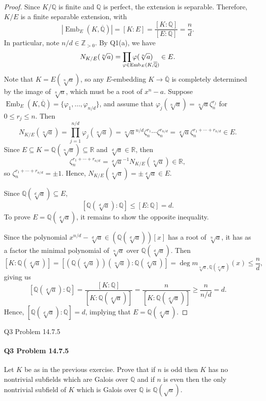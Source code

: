 \documentclass[12pt]{article}
\makeatletter
\newenvironment{fullbox}{\begin{lrbox}{\savefullbox}\begin{minipage}{\dimexpr\textwidth-2\fboxsep\relax}}{\end{minipage}\end{lrbox}\begin{center}\framebox[\textwidth]{\usebox{\savefullbox}}\end{center}}
\newenvironment{pbox}[1][]{\begin{fullbox}\ifx#1\empty\else\paragraph{#1}\fi}{\end{fullbox}}
\newcommand{\Z}{\mathbb{Z}}
\newcommand{\Q}{\mathbb{Q}}
\newcommand{\R}{\mathbb{R}}
\renewcommand{\phi}{\varphi}
\newcommand{\<}{\langle}
\renewcommand{\>}{\rangle}
\newcommand{\clo}{\overline}
\DeclareMathOperator{\Emb}{Emb}
\newcommand\myprod[2]{
    \begin{array}[t]{@{}l@{}}
        {\displaystyle\prod #2} \\[-3pt] \scriptstyle #1 
    \end{array}
}
\makeatother
\begin{document}
\begin{proof}
    Since $K/\Q$ is finite and $\Q$ is perfect, the extension is separable. Therefore, $K/E$ is a finite separable extension, with
    \[
        |\Emb_{E}(K, \clo{\Q})| = [K : E] = \frac{[K : \Q]}{[E : \Q]} = \frac{n}{d}.
    \]
    In particular, note $n/d \in \Z_{>0}$. By Q1(a), we have
    \[
        N_{K/E}(\sqrt[n]{a})
            = \myprod{\phi \in \Emb_{E}(K, \clo{\Q})}{\phi(\sqrt[n]{a})}
            \in E.
    \]
    Note that $K = E(\sqrt[n]{a})$, so any $E$-embedding $K \to \clo{\Q}$ is completely determined by the image of $\sqrt[n]{a}$, which must be a root of $x^n - a$. Suppose $\Emb_{E}(K, \clo{\Q}) = \{\phi_1, \dots, \phi_{n/d}\}$, and assume that $\phi_j(\sqrt[n]{a}) = \sqrt[n]{a} \zeta_n^{r_j}$ for $0 \leq r_j \leq n$. Then
    \[
        N_{K/E}(\sqrt[n]{a})
            = \prod_{j=1}^{n/d} \phi_j(\sqrt[n]{a})
            = \sqrt[n]{a}^{n/d} \zeta_n^{r_1} \cdots \zeta_n^{r_{n/d}}
            = \sqrt[d]{a} \zeta_n^{r_1 + \cdots + r_{n/d}}
            \in E.
    \]
    Since $E \subseteq K = \Q(\sqrt[n]{a}) \subseteq \R$ and $\sqrt[d]{a} \in \R$, then
    \[
        \zeta_n^{r_1 + \cdots + r_{n/d}} = \sqrt[d]{a}^{-1}N_{K/E}(\sqrt[n]{a}) \in \R,
    \]
    so $\zeta_n^{r_1 + \cdots + r_{n/d}} = \pm1$. Hence, $N_{K/E}(\sqrt[n]{a}) = \pm\sqrt[d]{a} \in E$. 
    
    Since $\Q(\sqrt[d]{a}) \subseteq E$, 
    \[
        [\Q(\sqrt[d]{a}) : \Q] \leq [E : \Q] = d.
    \]
    To prove $E = \Q(\sqrt[d]{a})$, it remains to show the opposite inequality.

    Since the polynomial $x^{n/d} - \sqrt[d]{a} \in (\Q(\sqrt[d]{a}))[x]$ has a root of $\sqrt[n]{a}$, it has as a factor the minimal polynomial of $\sqrt[n]{a}$ over $\Q(\sqrt[d]{a})$. Then
    \[
        [K : \Q(\sqrt[d]{a})] 
            = [(\Q(\sqrt[d]{a}))(\sqrt[n]{a}) : \Q(\sqrt[d]{a})]
            = \deg m_{\sqrt[n]{a}, \Q(\sqrt[d]{a})}(x)
            \leq \frac{n}{d},
    \]
    giving us
    \[
        [\Q(\sqrt[d]{a}) : \Q] 
            = \frac{[K : \Q]}{[K : \Q(\sqrt[d]{a})]} 
            = \frac{n}{[K : \Q(\sqrt[d]{a})]} 
            \geq \frac{n}{n/d} 
            = d.
    \]
    Hence, $[\Q(\sqrt[d]{a}) : \Q] = d$, implying that $E = \Q(\sqrt[d]{a})$.

\end{proof}


\newpage
\begin{pbox}[Q3 Problem 14.7.5]
    Let $K$ be as in the previous exercise. Prove that if $n$ is odd then $K$ has no nontrivial subfields which are Galois over $\Q$ and if $n$ is even then the only nontrivial subfield of $K$ which is Galois over $\Q$ is $\Q(\sqrt{a})$.
\end{pbox}
\end{document}
